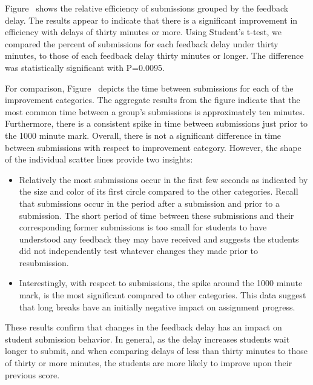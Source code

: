 Figure~ shows the relative efficiency of
submissions grouped by the feedback delay. The results appear to indicate that
there is a significant improvement in efficiency with delays of thirty minutes
or more. Using Student's t-test, we compared the percent of \imp{} submissions
for each feedback delay under thirty minutes, to those of each feedback delay
thirty minutes or longer. The difference was statistically significant with
P=0.0095.

For comparison, Figure~ depicts the time between
submissions for each of the improvement categories. The aggregate results from
the figure indicate that the most common time between a group's submissions is
approximately ten minutes. Furthermore, there is a consistent spike in time
between submissions just prior to the 1000 minute mark. Overall, there is not a
significant difference in time between submissions with respect to improvement
category. However, the shape of the individual scatter lines provide two
insights:

\begin{itemize}
\item Relatively the most \noii{} submissions occur in the first few seconds as
  indicated by the size and color of its first circle compared to the other
  categories. Recall that \noii{} submissions occur in the period after a
  \worse{} submission and prior to a \imp{} submission. The short period of
  time between these submissions and their corresponding former submissions is
  too small for students to have understood any feedback they may have received
  and suggests the students did not independently test whatever changes they
  made prior to resubmission.
\item Interestingly, with respect to \worse{} submissions, the spike around the
  1000 minute mark, is the most significant compared to other categories. This
  data suggest that long breaks have an initially negative impact on assignment
  progress.
\end{itemize}

These results confirm that changes in the feedback delay has an impact on
student submission behavior. In general, as the delay increases students wait
longer to submit, and when comparing delays of less than thirty minutes to
those of thirty or more minutes, the students are more likely to improve upon
their previous score.

